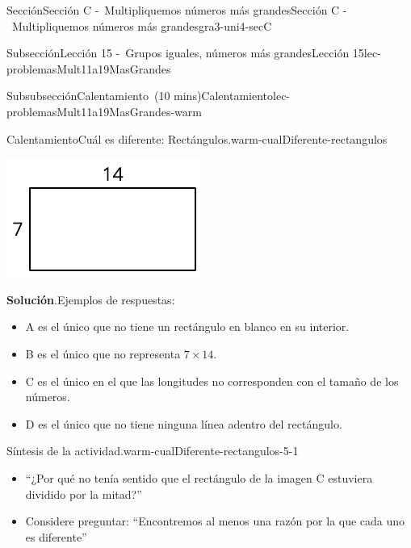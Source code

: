 \documentclass[oneside,10pt,]{article}
\newcommand{\blocktitlefont}{\relax}
\begin{document}
\begin{sectionptx}{Sección}{Sección C -~Multipliquemos números más grandes}{}{Sección C -~Multipliquemos números más grandes}{}{}{gra3-uni4-secC}
\begin{subsectionptx}{Subsección}{Lección 15 -~Grupos iguales, números más grandes}{}{Lección 15}{}{}{lec-problemasMult11a19MasGrandes}
\begin{subsubsectionptx}{Subsubsección}{Calentamiento~(10 mins)}{}{Calentamiento}{}{}{lec-problemasMult11a19MasGrandes-warm}
\begin{exploration}{Calentamiento}{Cuál es diferente: Rectángulos.}{warm-cualDiferente-rectangulos}
\begin{sidebyside}{2}{0}{0}{0}
\begin{sbspanel}{0.5}
\includegraphics[width=\linewidth]{external/svg-source/tikz-file-149353-scale13.pdf}
\end{sbspanel}%
\end{sidebyside}%
\par\smallskip%
\noindent\textbf{\blocktitlefont Solución}.\hypertarget{warm-cualDiferente-rectangulos-3}{}\quad{}Ejemplos de respuestas:%
%
\begin{itemize}[label=\textbullet]
\item{}A es el único que no tiene un rectángulo en blanco en su interior.%
\item{}B es el único que no representa \(7 \times 14\).%
\item{}C es el único en el que las longitudes no corresponden con el tamaño de los números.%
\item{}D es el único que no tiene ninguna línea adentro del rectángulo.%
\end{itemize}
\end{exploration}%
\par
\begin{paragraphs}{Síntesis de la actividad.}{warm-cualDiferente-rectangulos-5-1}%
%
\begin{itemize}[label=\textbullet]
\item{}``¿Por qué no tenía sentido que el rectángulo de la imagen C estuviera dividido por la mitad?''%
\item{}Considere preguntar: ``Encontremos al menos una razón por la que cada uno es diferente''%
\end{itemize}
\end{paragraphs}%
\end{subsubsectionptx}
%
%
\typeout{************************************************}

\end{subsectionptx}
\end{sectionptx}
\end{document}
